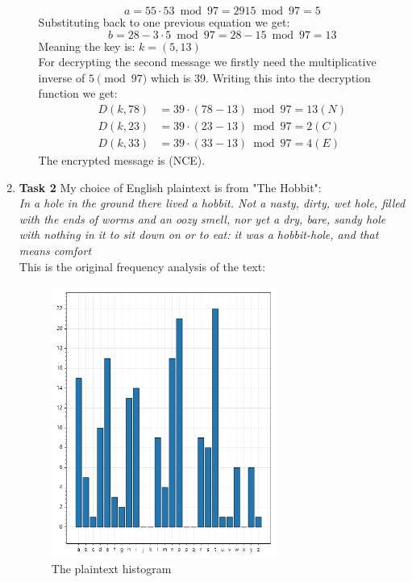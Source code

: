 \documentclass{article}
\begin{document}
\begin{enumerate}[label={}]
\begin{enumerate}
		\[a = 55 \cdot 53 \bmod 97 = 2915 \bmod 97 = 5\]
		Substituting back to one previous equation we get:
		\[b = 28 - 3 \cdot 5 \bmod 97 = 28 -15 \bmod 97 = 13\]
		Meaning the key is: $k = (5, 13)$\\
		For decrypting the second message we firstly need the multiplicative inverse of $5 \pmod 97$ which is 39. Writing this into the decryption function we get:
		\begin{align*}
			D(k, 78) &= 39 \cdot (78 - 13) \bmod 97 = 13 (N)\\
			D(k, 23) &= 39 \cdot (23 - 13) \bmod 97 = 2 (C)\\
			D(k, 33) &= 39 \cdot (33 - 13) \bmod 97 = 4 (E)
		\end{align*}
		The encrypted message is (NCE).
	\end{enumerate}
	\item \textbf{Task 2}
		My choice of English plaintext is from "The Hobbit":\\
		\textit{In a hole in the ground there lived a hobbit. Not a nasty, dirty, wet hole, filled with the ends of worms and an oozy smell, nor yet a dry, bare, sandy hole with nothing in it to sit down on or to eat: it was a hobbit-hole, and that means comfort}\\
		This is the original frequency analysis of the text:
		\begin{figure}[H]
			\centering
			\includegraphics[width=0.7\textwidth]{original.png}
			\caption{The plaintext histogram}
			\label{fig:originalHist}
		\end{figure}

\end{enumerate}
\end{document}

